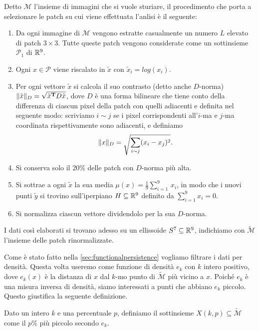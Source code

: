 Detto $\mathcal{M}$ l'insieme di immagini che si vuole sturiare, il procedimento che porta a selezionare le patch su cui viene effettuata l'anlisi è il seguente:
\begin{enumerate}
  \item Da ogni immagine di $\mathcal{M}$ vengono estratte casualmente un numero $L$ elevato di patch $3\times 3$. Tutte queste patch vengono considerate come un sottinsieme $\mathcal{P}_1$ di $\mathbb{R}^9$.
  \item Ogni $x\in\mathcal{P}$ viene riscalato in $\tilde{x}$ con $\tilde{x}_i = log(x_i)$.
  \item Per ogni vettore $\tilde{x}$ si calcola il suo contrasto (detto anche $D$-norma) $\normD{\tilde{x}}=\sqrt{\tilde{x}^\mathbf{T}D\tilde{x}}$, dove $D$ è una forma bilineare che tiene conto della differenza di ciascun pixel della patch con quelli adiacenti e definita nel seguente modo: scriviamo $i\sim j$ se i pixel corrispondenti all'$i$-ma e $j$-ma coordinata rispettivamente sono adiacenti, e definiamo
  \begin{equation*}
    \normD{x} = \sqrt{\sum_{i\sim j}(x_i-x_j)^2}.
  \end{equation*}
  \item Si conserva solo il $20\%$ delle patch con $D$-norma più alta.
  \item Si sottrae a ogni $\tilde{x}$ la sua media $\mu(x)=\displaystyle\frac{1}{9}\sum_{i=1}^9\,x_i$, in modo che i nuovi punti $\tilde{y}$ si trovino sull'iperpiano $H\subseteq\mathbb{R}^9$ definito da $\sum_{i=1}^9 x_i =0$.
  \item Si normalizza ciascun vettore dividendolo per la sua $D$-norma.
\end{enumerate}

I dati così elaborati si trovano adesso su un ellissoide $S^7\subseteq\mathbb{R}^9$, indichiamo con $\widetilde{\mathcal{M}}$ l'insieme delle patch rinormalizzate.


Come è stato fatto nella \cref{sec:functionalpersistence} vogliamo filtrare i dati per densità. Questa volta useremo come funzione di densità $e_k$ con $k$ intero positivo, dove $e_k(x)$ è la distanza di $x$ dal $k$-mo punto di $\widetilde{\mathcal{M}}$ più vicino a $x$. Poiché $e_k$ è una misura inversa di densità, siamo interessati a punti che abbiano $e_k$ piccolo. Questo giustifica la seguente definizione.

\begin{definition}
  Dato un intero $k$ e una percentuale $p$, definiamo il sottinsieme $X(k,p)\subseteq\widetilde{\mathcal{M}}$ come il $p\%$ più piccolo secondo $e_k$.
\end{definition}

